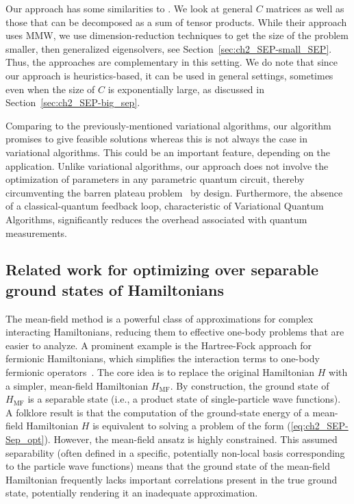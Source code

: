 Our approach has some similarities to \cite{shi2015epsilon}. 
We look at general $C$ matrices as well as those that can be decomposed as a sum of tensor products. 
While their approach uses MMW, we use dimension-reduction techniques to get the size of the problem smaller, then generalized eigensolvers, see Section~\ref{sec:ch2_SEP-small_SEP}. 
Thus, the approaches are complementary in this setting. 
We do note that since our approach is heuristics-based, it can be used in general settings, sometimes even when the size of $C$ is exponentially large, as discussed in Section~\ref{sec:ch2_SEP-big_sep}. 

Comparing to the previously-mentioned variational algorithms, our algorithm promises to give feasible solutions whereas this is not always the case in  variational algorithms. 
This could be an important feature, depending on the application.
Unlike variational algorithms, our approach does not involve the optimization of parameters in any parametric quantum circuit, thereby circumventing the barren plateau problem~\cite{mcclean2018barren} by design. Furthermore, the absence of a classical-quantum feedback loop, characteristic of Variational Quantum Algorithms, significantly reduces the overhead associated with quantum measurements.


\subsection{Related work for optimizing over separable ground states of Hamiltonians} \label{ss:ch2_SEP-Hammy_related}

The mean-field method is a powerful class of approximations for complex interacting Hamiltonians, reducing them to effective one-body problems that are easier to analyze. A prominent example is the Hartree-Fock approach for fermionic Hamiltonians, which simplifies the interaction terms to one-body fermionic operators~\cite{google2020hartree}. The core idea is to replace the original Hamiltonian 
$H$ with a simpler, mean-field Hamiltonian $H_{\text{MF}}$. By construction, the ground state of $H_{\text{MF}}$ is a separable state (i.e., a product state of single-particle wave functions). 
A folklore result is that the computation of the ground-state energy of a mean-field Hamiltonian $H$ is equivalent to solving a problem of the form (\ref{eq:ch2_SEP-Sep_opt}). 
However, the mean-field ansatz is highly constrained. This assumed separability (often defined in a specific, potentially non-local basis corresponding to the particle wave functions) means that the ground state of the mean-field Hamiltonian frequently lacks important correlations present in the true ground state, potentially rendering it an inadequate approximation.

